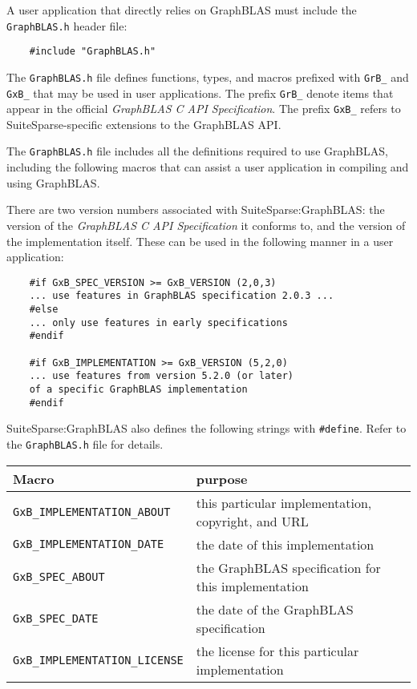 \documentclass[12pt]{article}
\begin{document}
A user application that directly relies on GraphBLAS must include the
\verb'GraphBLAS.h' header file:

\begin{mdframed}[userdefinedwidth=6in]
{\footnotesize
\begin{verbatim}
    #include "GraphBLAS.h"
\end{verbatim}
} \end{mdframed}

The \verb'GraphBLAS.h' file defines functions, types, and macros prefixed with
\verb'GrB_' and \verb'GxB_' that may be used in user applications.  The prefix
\verb'GrB_' denote items that appear in the official {\em GraphBLAS C API
Specification}.  The prefix \verb'GxB_' refers to SuiteSparse-specific
extensions to the GraphBLAS API.

The \verb'GraphBLAS.h' file includes all the definitions required to use
GraphBLAS, including the following macros that can assist a user application in
compiling and using GraphBLAS.

There are two version numbers associated with SuiteSparse:GraphBLAS:
the version of the {\em GraphBLAS C API Specification} it
conforms to, and the version of the implementation itself.  These can
be used in the following manner in a user application:

{\footnotesize
\begin{verbatim}
    #if GxB_SPEC_VERSION >= GxB_VERSION (2,0,3)
    ... use features in GraphBLAS specification 2.0.3 ...
    #else
    ... only use features in early specifications
    #endif

    #if GxB_IMPLEMENTATION >= GxB_VERSION (5,2,0)
    ... use features from version 5.2.0 (or later)
    of a specific GraphBLAS implementation
    #endif \end{verbatim}}

SuiteSparse:GraphBLAS also defines the following strings with \verb'#define'.
Refer to the \verb'GraphBLAS.h' file for details.

\vspace{0.2in}
{\footnotesize
\begin{tabular}{ll}
\hline
Macro                & purpose                                      \\
\hline
\verb'GxB_IMPLEMENTATION_ABOUT'
    & this particular implementation, copyright, and URL \\
\verb'GxB_IMPLEMENTATION_DATE'
    & the date of this implementation \\
\verb'GxB_SPEC_ABOUT'
    & the GraphBLAS specification for this implementation \\
\verb'GxB_SPEC_DATE'
    & the date of the GraphBLAS specification \\
\verb'GxB_IMPLEMENTATION_LICENSE'
    & the license for this particular implementation \\
\hline
\end{tabular}
}
\vspace{0.2in}
\end{document}
